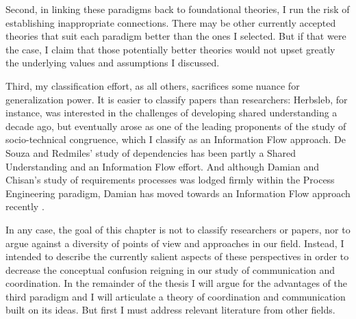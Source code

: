 Second, in linking these paradigms back to foundational theories, I run the risk of establishing inappropriate connections. There may be other currently accepted theories that suit each paradigm better than the ones I selected. But if that were the case, I claim that those potentially better theories would not upset greatly the underlying values and assumptions I discussed.

Third, my classification effort, as all others, sacrifices some nuance for generalization power. It is easier to classify papers than researchers: Herbsleb, for instance, was interested in the challenges of developing shared understanding a decade ago, but eventually arose as one of the leading proponents of the study of socio-technical congruence, which I classify as an Information Flow approach. De Souza and Redmiles' study of dependencies has been partly a Shared Understanding \cite{deSouza2003} and an Information Flow \cite{deSouza2008} effort. And although Damian and Chisan's  study of requirements processes was lodged firmly within the Process Engineering paradigm, Damian has moved towards an Information Flow approach recently \cite{Damian2007}.

In any case, the goal of this chapter is not to classify researchers or papers, nor to argue against a diversity of points of view and approaches in our field. Instead, I intended to describe the currently salient aspects of these perspectives in order to decrease the conceptual confusion reigning in our study of communication and coordination. In the remainder of the thesis I will argue for the advantages of the third paradigm and I will articulate a theory of coordination and communication built on its ideas. But first I must address relevant literature from other fields.
